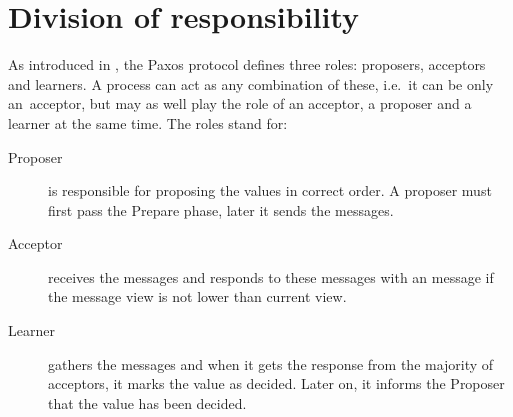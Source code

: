 \section{Division of responsibility}

As introduced in \cite{Lam01}, the Paxos protocol defines three roles: proposers, acceptors and learners.
A process can act as any combination of these, i.e.\ it can be only an~acceptor, but may as well play the role of an acceptor, a proposer and a learner at the same time. The roles stand for:
\begin{description}
 \item[Proposer] is responsible for proposing the values in correct order. A proposer must first pass the Prepare phase, later it sends the \propose messages.
 
 \item[Acceptor] receives the \propose messages and responds to these messages with an \accept message if the message view is not lower than current view.
 
 \item[Learner] gathers the \accept messages and when it gets the response from the majority of acceptors, it marks the value as decided. Later on, it informs the Proposer that the value has been decided.
\end{description}
